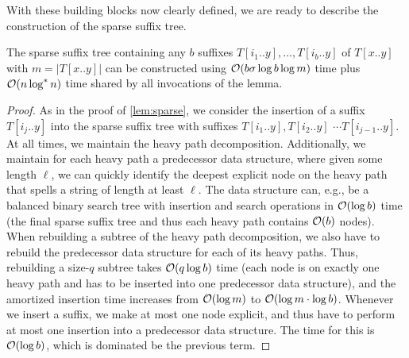 With these building blocks now clearly defined, we are ready to describe the construction of the sparse suffix tree.

\begin{lemma}
\label{lem:sparse-algo}
The sparse suffix tree containing any $b$ suffixes $T[i_{1}..y], \ldots, T[i_{b}..y]$
of $T[x..y]$ with $m=|T[x..y]|$ can be constructed using $\mathcal{O}(b\sigma\log b\log m)$ time plus $\mathcal{O}(n \log^* n)$ time shared by all invocations of the lemma.
\end{lemma}

\begin{proof}
As in the proof of \cref{lem:sparse}, we consider the insertion of a suffix $T[i_j .. y]$ into the sparse suffix tree with suffixes $T[i_{1} .. y], T[i_{2} .. y] $ $\cdots T[i_{j-1} .. y]$.
At all times, we maintain the heavy path decomposition. Additionally, we maintain for each heavy path a predecessor data structure, where given some length $\ell$, we can quickly identify the deepest explicit node on the heavy path that spells a string of length at least $\ell$. The data structure can, e.g., be a balanced binary search tree with insertion and search operations in $\mathcal{O}(\log b)$ time (the final sparse suffix tree and thus each heavy path contains $\mathcal{O}(b)$ nodes). 
When rebuilding a subtree of the heavy path decomposition, we also have to rebuild the predecessor data structure for each of its heavy paths. 
Thus, rebuilding a size-$q$ subtree takes $\mathcal{O}(q \log b)$ time (each node is on exactly one heavy path and has to be inserted into one predecessor data structure), and the amortized insertion time increases from $\mathcal{O}(\log m)$ to $\mathcal{O}(\log m \cdot \log b)$.
Whenever we insert a suffix, we make at most one node explicit, and thus have to perform at most one insertion into a predecessor data structure. The time for this is $\mathcal{O}(\log b)$, which is dominated be the previous term.


\end{proof}
